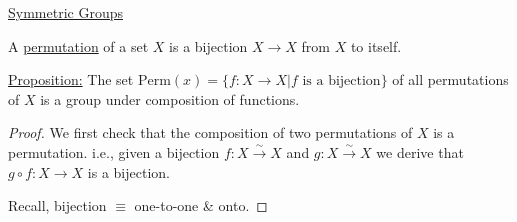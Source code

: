 \documentclass{article}
\theoremstyle{definition}
\begin{document}
\noindent\underline{Symmetric Groups}

\begin{tcolorbox} [title= Definition:, colback=black!10!white]
    A \underline{permutation} of a set $X$ is a bijection $X\to X$ from $X$ to itself.
\end{tcolorbox}

\noindent\underline{Proposition:} The set $\text{Perm}(x)=\{f:X\to X|\text{$f$ is a bijection}\}$ of all permutations of $X$ is a group under composition of functions.

\begin{proof}
    We first check that the composition of two permutations of $X$ is a permutation. i.e., given a bijection $f:X\xrightarrow{\sim}X$ and $g:X\xrightarrow{\sim} X$ we derive that $g\circ f:X\to X$ is a bijection. 

    Recall, bijection $\equiv$ one-to-one \& onto.

\end{proof}
\end{document}
